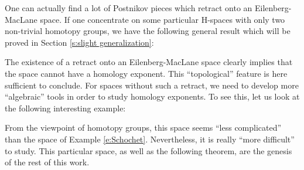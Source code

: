 \begin{exmp}\label{e:Schochet}
\label{exmp_retract}

\end{exmp}
\theoremstyle{definition}
\newtheorem*{exmp_retract}{\mbox{\ref{exmp_retract}.~Example}}

\begin{thm}\label{t:space with a retract}
\label{thm_retract}

\end{thm}
\theoremstyle{plain}
\newtheorem*{thm_retract}{\mbox{\ref{thm_retract}.~Theorem}}



One can actually find a lot of Postnikov pieces which retract onto an Eilenberg-MacLane space. If one concentrate on some particular H-spaces with only two non-trivial homotopy groups, we have the following general result which will be proved in Section \ref{s:slight generalization}:

\begin{thm}\label{t:retract for two stage Postnikov systems}
\label{thm_slight_gen}

\end{thm}
\theoremstyle{plain}
\newtheorem*{thm_slight_gen}{\mbox{\ref{thm_slight_gen}.~Theorem}}

The existence of a retract onto an Eilenberg-MacLane space clearly implies that the space cannot have a homology exponent. This ``topological'' feature is here sufficient to conclude. For spaces without such a retract, we need to develop more ``algebraic'' tools in order to study homology exponents. To see this, let us look at the following interesting example:

\begin{exmp}\label{e:space without a retract}
\label{exmp_no_retract}

\end{exmp}
\theoremstyle{definition}
\newtheorem*{exmp_no_retract}{\mbox{\ref{exmp_no_retract}.~Example}}

\vskip2cm
From the viewpoint of homotopy groups, this space seems ``less complicated'' than the space of Example \ref{e:Schochet}. Nevertheless, it is really ``more difficult'' to study. This particular space, as well as the following theorem, are the genesis of the rest of this work.

\begin{thm}\label{t:space without a retract}
\label{thm_no_retract}

\end{thm}
\theoremstyle{plain}
\newtheorem*{thm_no_retract}{\mbox{\ref{thm_no_retract}.~Theorem}}



